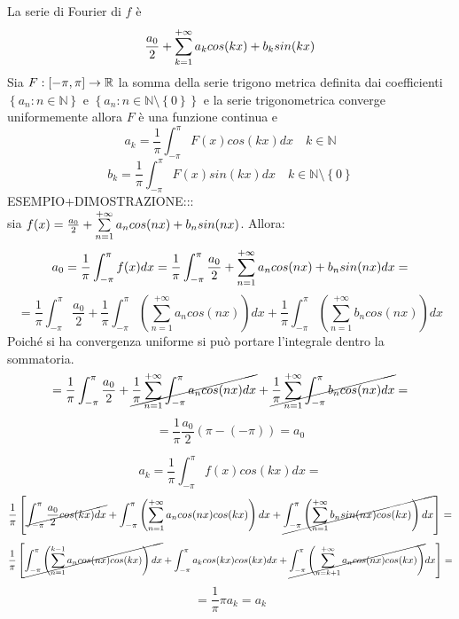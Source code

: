 La serie di Fourier di $f$ è
$$\frac{a_0}{2}+\sum\limits_{k=1}^{+\infty}a_{k}cos(kx)+b_{k}sin(kx)$$
\proposition
Sia $F:\left[-\pi,\pi\right]\to \mathbb{R}$ la somma della serie trigono metrica definita dai coefficienti $\left\{a_n:n\in\mathbb{N}\right\}$ e $\left\{a_n:n\in\mathbb{N}\setminus{\left\{0\right\}}\right\}$ e la serie trigonometrica converge uniformemente allora $F$ è una funzione continua e 
$$a_k=\frac{1}{\pi}\int_{-\pi}^{\pi}F(x)cos(kx)dx\quad k\in\mathbb{N}$$
$$b_k=\frac{1}{\pi}\int_{-\pi}^{\pi}F(x)sin(kx)dx\quad k\in\mathbb{N}\setminus{\left\{0\right\}}$$
ESEMPIO+DIMOSTRAZIONE:::\\
sia $f(x)=\frac{a_0}{2}+\sum\limits_{n=1}^{+\infty}a_{n}cos(nx)+b_{n}sin(nx)$. Allora:\\
$$a_0=\frac{1}{\pi}\int_{-\pi}^{\pi}f(x)dx=\frac{1}{\pi}\int_{-\pi}^{\pi}\frac{a_0}{2}+\sum\limits_{n=1}^{+\infty}a_{n}cos(nx)+b_{n}sin(nx)dx=$$
$$ 
= \frac{1}{\pi}\int_{-\pi}^{\pi}\frac{a_0}{2} +
\frac{1}{\pi}\int_{-\pi}^{\pi}\left(\sum\limits_{n=1}^{+\infty} a_ncos(nx)\right)dx + 
\frac{1}{\pi}\int_{-\pi}^{\pi}\left(\sum\limits_{n=1}^{+\infty} b_ncos(nx)\right)dx
$$
Poiché si ha convergenza uniforme si può portare l'integrale dentro la sommatoria.
$$ 
= \frac{1}{\pi}\int_{-\pi}^{\pi}\frac{a_0}{2} +
\cancel{\frac{1}{\pi}\sum\limits_{n=1}^{+\infty}\int_{-\pi}^{\pi} a_ncos(nx)dx} + 
\cancel{\frac{1}{\pi}\sum\limits_{n=1}^{+\infty}\int_{-\pi}^{\pi} b_ncos(nx)dx}=
$$
$$=\frac{1}{\pi}\frac{a_0}{2}\left(\pi-(-\pi)\right)=a_0$$


$$a_k=\frac{1}{\pi}\int_{-\pi}^{\pi}f(x)cos(kx)dx=$$
$$\frac{1}{\pi}\left[
\cancel{\int_{-\pi}^{\pi}\frac{a_0}{2}cos(kx)dx}+
\int_{-\pi}^{\pi}\left(\sum\limits_{n=1}^{+\infty}a_ncos(nx)cos(kx)\right)dx+
\cancel{\int_{-\pi}^{\pi}\left(\sum\limits_{n=1}^{+\infty}b_nsin(nx)cos(kx)\right)dx}
\right]=$$
$$\frac{1}{\pi}\left[
\cancel{\int_{-\pi}^{\pi}\left(\sum\limits_{n=1}^{k-1} a_ncos(nx)cos(kx)\right)dx}+
\int_{-\pi}^{\pi}a_kcos(kx)cos(kx)dx+
\cancel{\int_{-\pi}^{\pi}\left(\sum\limits_{n=k+1}^{+\infty}a_ncos(nx)cos(kx)\right)}dx
\right]=$$
$$=\frac{1}{\pi}\pi a_k=a_k$$


